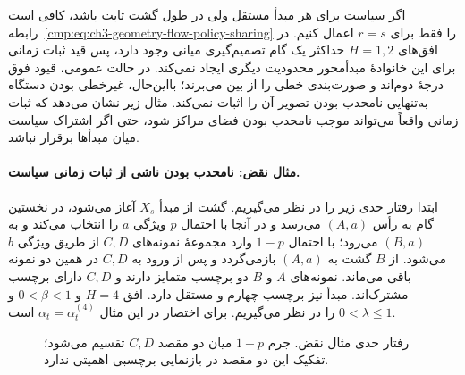 اگر سیاست برای هر مبدأ مستقل ولی در طول گشت ثابت باشد، کافی است رابطه~\eqref{cmp:eq:ch3-geometry-flow-policy-sharing} را فقط برای $r=s$ اعمال کنیم. در افق‌های $H=1,2$ حداکثر یک گام تصمیم‌گیری میانی وجود دارد، پس قید ثبات زمانی برای این خانوادهٔ مبدأمحور محدودیت دیگری ایجاد نمی‌کند. در حالت عمومی، قیود فوق درجهٔ دوم‌اند و صورت‌بندی خطی را از بین می‌برند؛ بااین‌حال، غیرخطی بودن دستگاه به‌تنهایی نامحدب بودن تصویر آن را اثبات نمی‌کند. مثال زیر نشان می‌دهد که ثبات زمانی واقعاً می‌تواند موجب نامحدب بودن فضای مراکز شود، حتی اگر اشتراک سیاست میان مبدأها برقرار نباشد.

\paragraph{مثال نقض: نامحدب بودن ناشی از ثبات زمانی سیاست.}
ابتدا رفتار حدی زیر را در نظر می‌گیریم. گشت از مبدأ $X_s$ آغاز می‌شود، در نخستین گام به رأس $(A,a)$ می‌رسد و در آنجا با احتمال $p$ ویژگی $a$ را انتخاب می‌کند و به $(B,a)$ می‌رود؛ با احتمال $1-p$ وارد مجموعهٔ نمونه‌های $C,D$ از طریق ویژگی $b$ می‌شود. از $B$ گشت به $(A,a)$ بازمی‌گردد و پس از ورود به $C,D$ در همین دو نمونه باقی می‌ماند. نمونه‌های $A$ و $B$ دو برچسب متمایز دارند و $C,D$ دارای برچسب مشترک‌اند. مبدأ نیز برچسب چهارم و مستقل دارد. افق $H=4$ و $0<\beta<1$ و $0<\lambda\le1$ را در نظر می‌گیریم. برای اختصار در این مثال $\alpha_t=\alpha_t^{(4)}$ است.

\begin{figure}[!htbp]
\centering
\begin{LTR}
\end{LTR}
\caption{رفتار حدی مثال نقض. جرم $1-p$ میان دو مقصد $C,D$ تقسیم می‌شود؛ تفکیک این دو مقصد در بازنمایی برچسبی اهمیتی ندارد.}
\label{cmp:fig:ch3-geometry-nonconvex-walk}
\end{figure}


